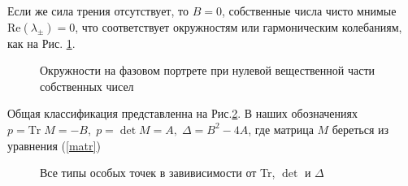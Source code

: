 \documentclass[a4paper,12pt,titlepage]{article}
\theoremstyle{definition}
\theoremstyle{theorem}
\theoremstyle{definition}
\begin{document}
Если же сила трения отсутствует, то $B = 0$, собственные числа чисто мнимые $\text{Re} (\lambda_{\pm}) = 0$,
что соответствует окружностям или гармоническим колебаниям, 
как на Рис. \ref*{cir}.

\begin{figure}[h!!!]

    \noindent{}
    \caption{Окружности на фазовом портрете при нулевой вещественной части собственных чисел \cite{cir}}
    \label{cir}
\end{figure}
Общая классификация представленна на Рис.\ref*{all}. В наших обозначениях 
$p = \text{Tr}\; M = -B, \; p = \det M = A, \; \Delta = B^2 - 4A$, 
где матрица $M$ береться из уравнения (\ref*{matr})
\begin{figure}[h!!!]

    \noindent{}
    \caption{Все типы особых точек в завивисимости от Tr, $\det$ и $\Delta$ \cite{all}}
    \label{all}
\end{figure}


\newpage
\end{document}
